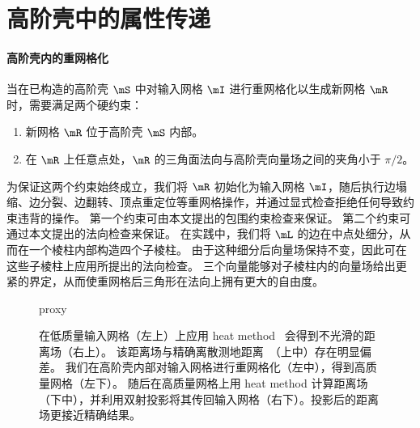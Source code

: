 ﻿\section{高阶壳中的属性传递}

\paragraph{高阶壳内的重网格化}
当在已构造的高阶壳 $\mS$ 中对输入网格 $\mI$ 进行重网格化以生成新网格 $\mR$ 时，需要满足两个硬约束：
\begin{enumerate}
  \item 新网格 $\mR$ 位于高阶壳 $\mS$ 内部。
  \item 在 $\mR$ 上任意点处，$\mR$ 的三角面法向与高阶壳向量场之间的夹角小于 $\pi/2$。
\end{enumerate}
为保证这两个约束始终成立，我们将 $\mR$ 初始化为输入网格 $\mI$，随后执行边塌缩、边分裂、边翻转、顶点重定位等重网格操作，并通过显式检查拒绝任何导致约束违背的操作。
%
第一个约束可由本文提出的包围约束检查来保证。
%
第二个约束可通过本文提出的法向检查来保证。
%
在实践中，我们将 $\mL$ 的边在中点处细分，从而在一个棱柱内部构造四个子棱柱。
%
由于这种细分后向量场保持不变，因此可在这些子棱柱上应用所提出的法向检查。
%
三个向量能够对子棱柱内的向量场给出更紧的界定，从而使重网格后三角形在法向上拥有更大的自由度。


\begin{figure}[t]
	\centering
	\begin{overpic}[width=0.99\linewidth]{proxy}
		{
		}
	\end{overpic}
	\vspace{-3.5mm}
	\caption{
		在低质量输入网格（左上）上应用 heat method~\cite{Crane2012GeodesicsIH} 会得到不光滑的距离场（右上）。
  该距离场与精确离散测地距离~\cite{mitchell1987discrete}（上中）存在明显偏差。
  我们在高阶壳内部对输入网格进行重网格化（左中），得到高质量网格（左下）。
  随后在高质量网格上用 heat method 计算距离场（下中），并利用双射投影将其传回输入网格（右下）。投影后的距离场更接近精确结果。
	}
	\label{fig:proxy}
\end{figure}

